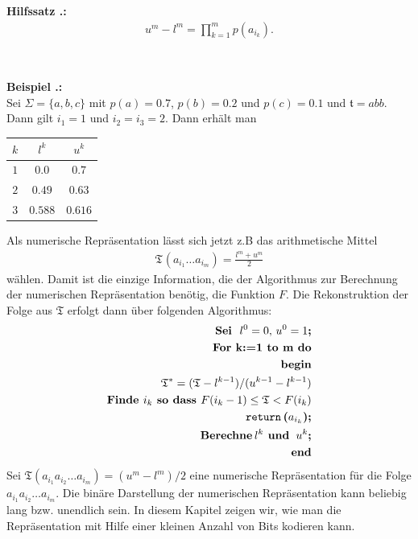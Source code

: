 \documentclass[a4paper,12pt]{article}
\newcounter{Hilfssatz}
\newcounter{Beispiel}
\newcounter{Algorithmus}
\newenvironment{Hilfssatz}{
\medskip
        
        \setlength{\parindent}{0pt}
        \addtocounter{Hilfssatz}{1}
        \textbf{\textsf{Hilfssatz \thesubsection.\theHilfssatz}:}\\}{
        \nopagebreak
        \vspace{-1.0ex}
        \bigskip\\
        
}
\newenvironment{Beispiel}{
\medskip
        
        \setlength{\parindent}{0pt}
        \addtocounter{Beispiel}{1}
        \textbf{\textsf{Beispiel \thesubsection.\theBeispiel}:}\\}{
        \nopagebreak
        \vspace{-1.0ex}
        \bigskip
        
}
\begin{document}
\begin{Hilfssatz}
\begin{align*}
u^{m} - l^{m} = \prod_{k=1}^{m}p(a_{i_{k}}).
\end{align*}
\end{Hilfssatz}
\begin{Beispiel}
Sei $\Sigma = \{a,b,c\}$ mit $p(a)=0.7$, $p(b) =0.2$ und $p(c)=0.1$ und $\mathfrak{t}=abb$.
Dann gilt $i_1=1$ und $i_2=i_3 =2$.
Dann erhält man
\begin{center}
\begin{tabular}{c|c|c}
$k$ & $l^k$ & $u^k$
\\
\hline
$1$ & $0.0$ & $0.7$
\\
\hline
$2$ & $0.49$ & $ 0.63$ 
\\
\hline
$3$ & $0.588$ & $0.616$
\end{tabular}
\end{center}
\end{Beispiel}
Als numerische Repräsentation lässt sich jetzt z.B das arithmetische Mittel
\begin{align*}
\mathfrak{T}^{}(a_{i_{1}}\ldots a_{i_{m}})= \frac{l^{m} + u^{m}}{2}
\end{align*}
wählen. Damit ist die einzige Information, die der Algorithmus zur Berechnung der numerischen Repräsentation benötig, die Funktion $F$. Die Rekonstruktion der Folge aus $\mathfrak{T}$ erfolgt dann über folgenden Algorithmus:
\begin{align*}
\textbf{\text{Sei}\; $l^{0}=0,\,u^{0}=1$;}
\\
\textbf{\text{For k:=1 to m do}}
\\
\textbf{\text{begin}}
\\
\mathfrak{T}^{*}= (\mathfrak{T} - l^{k-1}) / (u^{k-1} - l^{k-1})
\\
\textbf{\text{Finde $i_k$ so dass $F(i_k -1) \leq \mathfrak{T} < F(i_k)$}}
\\
\textbf{\text{{\tt{return}}}\,($a_{i_{k}}$);}
\\
 \textbf{\text{Berechne}\,$l^{k}$ \textbf{und}\, $u^{k}$;}
\\
\textbf{\text{end}}
\end{align*}
Sei $\mathfrak{T}(a_{i_{1}}a_{i_{2}}\ldots a_{i_{m}}) = (u^{m} - l^{m})/2$ eine numerische Repräsentation für die Folge $a_{i_{1}}a_{i_{2}}\ldots a_{i_{m}}$. Die binäre Darstellung der numerischen Repräsentation kann  beliebig lang bzw. unendlich sein. In diesem Kapitel zeigen wir, wie man die Repräsentation mit Hilfe einer kleinen Anzahl von Bits kodieren kann. 
\end{document}
